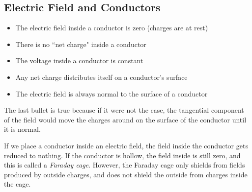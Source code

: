 \documentclass[class=article, crop=false]{standalone}
\begin{document}
  \subsection{Electric Field and Conductors}
  \begin{itemize}
    \item The electric field inside a conductor is zero (charges are at rest)
    \item There is no ``net charge" inside a conductor
    \item The voltage inside a conductor is constant
    \item Any net charge distributes itself on a conductor's surface
    \item The electric field is always normal to the surface of a conductor
  \end{itemize}
  \begin{note}{}
    The last bullet is true because if it were not the case, the tangential component of the field would move the charges around on the surface of the conductor until it is normal.
  \end{note}
  If we place a conductor inside an electric field, the field inside the conductor gets reduced to nothing. If the conductor is hollow, the field inside is still zero, and this is called a \emph{Faraday cage}. However, the Faraday cage only shields from fields produced by outside charges, and does not shield the outside from charges inside the cage.
\end{document}
